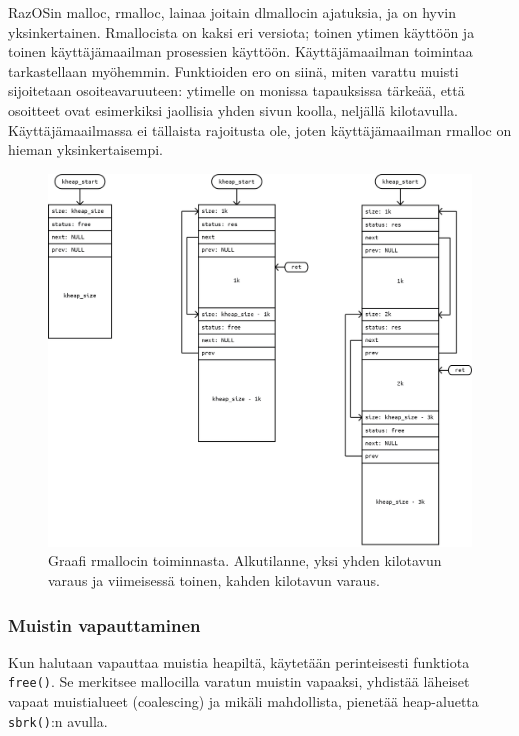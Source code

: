 \par

RazOSin malloc, rmalloc, lainaa joitain dlmallocin ajatuksia, ja on hyvin yksinkertainen. Rmallocista on kaksi eri versiota; toinen ytimen käyttöön ja toinen käyttäjämaailman prosessien käyttöön. Käyttäjämaailman toimintaa tarkastellaan myöhemmin. Funktioiden ero on siinä, miten varattu muisti sijoitetaan osoiteavaruuteen: ytimelle on monissa tapauksissa tärkeää, että osoitteet ovat esimerkiksi jaollisia yhden sivun koolla, neljällä kilotavulla. Käyttäjämaailmassa ei tällaista rajoitusta ole, joten käyttäjämaailman rmalloc on hieman yksinkertaisempi.

\begin{figure}[H]
\centering
\includegraphics[width=\textwidth]{../figures/rmalloc.png}
\caption{Graafi rmallocin toiminnasta. Alkutilanne, yksi yhden kilotavun varaus ja viimeisessä toinen, kahden kilotavun varaus.}
\label{fig:rmalloc}
\end{figure}

\subsubsection{Muistin vapauttaminen}
Kun halutaan vapauttaa muistia heapiltä, käytetään perinteisesti funktiota \texttt{free()}. Se merkitsee mallocilla varatun muistin vapaaksi, yhdistää läheiset vapaat muistialueet (coalescing) ja mikäli mahdollista, pienetää heap-aluetta \texttt{sbrk()}:n avulla.

